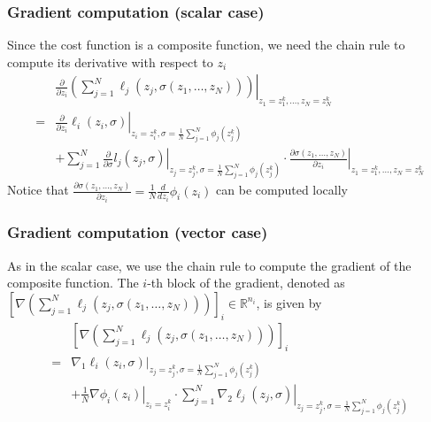 \documentclass{book}
\newcommand{\R}{\mathbb{R}}
\theoremstyle{theoremv2}
\theoremstyle{defv2}
\theoremstyle{remark}
\theoremstyle{remark}
\theoremstyle{definition}
\theoremstyle{definition}
\begin{document}
\subsubsection{Gradient computation (scalar case)}
Since the cost function is a composite function, we need the chain rule to compute its derivative with respect to $z_i$ 
\begin{align*}
    &\displaystyle\frac{\partial}{\partial z_i}\left.\left(\displaystyle\sum_{j=1}^{N}\ell_j(z_j,\sigma(z_1,\dots,z_N))\right)\right|_{z_1 = z_1^k,\dots,z_N = z_N^k} \\
    =& \left.\displaystyle\frac{\partial}{\partial z_i} \ell_i(z_i,\sigma)\right|_{z_i=z_i^k, \sigma=\frac{1}{N}\sum_{j=1}^{N}\phi_j(z_j^k)}  \\
    &+\left. \sum_{j=1}^{N}\displaystyle\frac{\partial}{\partial\sigma}l_j(z_j,\sigma)\right|_{z_j=z_j^k, \sigma=\frac{1}{N}\sum_{j=1}^{N}\phi_j(z_j^k)}\cdot \left.\displaystyle\frac{\partial\sigma(z_1,\dots,z_N)}{\partial z_i}\right|_{z_1=z_1^k,\dots,z_N = z_N^k}
\end{align*}
Notice that $\displaystyle\frac{\partial\sigma(z_1,\dots,z_N)}{\partial z_i}=\displaystyle\frac{1}{N}\displaystyle\frac{d}{d z_i}\phi_i(z_i)$ can be computed locally

\subsubsection{Gradient computation (vector case)}
As in the scalar case, we use the chain rule to compute the gradient of the composite function. The $i$-th block of the gradient, denoted as $\left[\nabla\left(\displaystyle\sum_{j=1}^{N}\ell_j(z_j,\sigma(z_1,\dots,z_N))\right)\right]_i\in\R^{n_i}$, is given by
\begin{align*}
    &\left[\nabla\left(\displaystyle\sum_{j=1}^{N}\ell_j(z_j,\sigma(z_1,\dots,z_N))\right)\right]_i \\ 
    =& \left.\nabla_1\ell_i(z_i,\sigma)\right|_{z_j=z_j^k, \sigma=\frac{1}{N}\sum_{j=1}^{N}\phi_j(z_j^k)} \\ 
    &+ \left.\displaystyle\frac{1}{N}\nabla \phi_i(z_i)\right|_{z_i=z_i^k}\cdot \left.\displaystyle\sum_{j=1}^{N}\nabla_2 \ell_j(z_j,\sigma)\right|_{z_j=z_j^k, \sigma=\frac{1}{N}\sum_{j=1}^{N}\phi_j(z_j^k)}
\end{align*}
\end{document}
